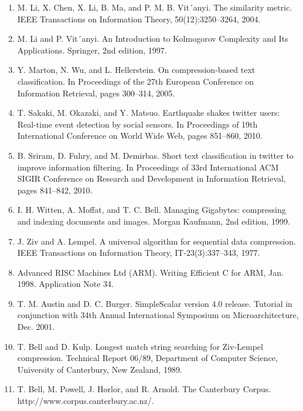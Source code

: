 \documentclass{article}
\begin{document}
\begin{enumerate}
	\item M. Li, X. Chen, X. Li, B. Ma, and P. M. B. Vit´anyi.
	The similarity metric. IEEE Transactions on
	Information Theory, 50(12):3250–3264, 2004.

	\item M. Li and P. Vit´anyi. An Introduction to Kolmogorov
	Complexity and Its Applications. Springer, 2nd
	edition, 1997.

	\item Y. Marton, N. Wu, and L. Hellerstein. On
	compression-based text classification. In Proceedings of
	the 27th European Conference on Information
	Retrieval, pages 300–314, 2005.
	
	\item T. Sakaki, M. Okazaki, and Y. Matsuo. Earthquake
	shakes twitter users: Real-time event detection by
	social sensors. In Proceedings of 19th International
	Conference on World Wide Web, pages 851–860, 2010.
	
	\item B. Sriram, D. Fuhry, and M. Demirbas. Short text
	classification in twitter to improve information
	filtering. In Proceedings of 33rd International ACM
	SIGIR Conference on Research and Development in
	Information Retrieval, pages 841–842, 2010.
	
	\item I. H. Witten, A. Moffat, and T. C. Bell. Managing
	Gigabytes: compressing and indexing documents and
	images. Morgan Kaufmann, 2nd edition, 1999.

	\item J. Ziv and A. Lempel. A universal algorithm for
	sequential data compression. IEEE Transactions on
	Information Theory, IT-23(3):337–343, 1977.
	
	\item Advanced RISC Machines Ltd (ARM). Writing Efficient
	C for ARM, Jan. 1998. Application Note 34.
	
	\item T. M. Austin and D. C. Burger. SimpleScalar version 4.0
	release. Tutorial in conjunction with 34th Annual International Symposium on Microarchitecture, Dec. 2001.
	
	\item T. Bell and D. Kulp. Longest match string searching for
	Ziv-Lempel compression. Technical Report 06/89, Department of Computer Science, University of Canterbury,
	New Zealand, 1989.
	
	\item T. Bell, M. Powell, J. Horlor, and R. Arnold. The Canterbury Corpus. http://www.corpus.canterbury.ac.nz/.


\end{enumerate}
\end{document}
